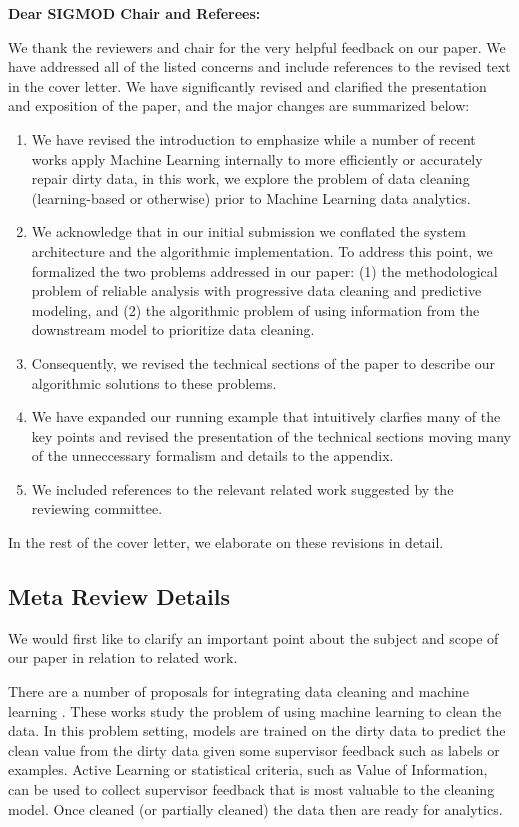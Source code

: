 {\noindent \normalsize \bf Dear SIGMOD Chair and Referees: }

\vspace{.5em}

We thank the reviewers and chair for the very helpful feedback on our paper. We have addressed all of the listed concerns and include references to the revised text in the cover letter. 
We have significantly revised and clarified the presentation and exposition
of the paper, and the major changes are summarized below:
\begin{enumerate}
\item We have revised the introduction to emphasize while a number of recent works apply Machine Learning internally to more efficiently or accurately repair dirty data, in this work, we explore the problem of data cleaning (learning-based or otherwise) prior to Machine Learning data analytics.
\item We acknowledge that in our initial submission we conflated the system architecture and the algorithmic implementation. To address this point, we formalized the two problems addressed in our paper: (1) the methodological problem of reliable analysis with progressive data cleaning and predictive modeling, and (2) the algorithmic problem of using information from the downstream model to prioritize data cleaning. 
\item Consequently, we revised the technical sections of the paper to describe our algorithmic solutions to these problems. 
\item We have expanded our running example that intuitively clarfies many of the key points and revised the presentation of the technical sections moving many of the unneccessary formalism and details to the appendix.
\item We included references to the relevant related work suggested by the reviewing committee.
\end{enumerate}
In the rest of the cover letter, we elaborate on these revisions in detail.

\vspace{0.5em}

\subsection*{Meta Review Details} 

We would first like to clarify an important point about the subject and scope of our paper in relation to related work.

There are a number of proposals for integrating data cleaning and machine learning \cite{gokhale2014corleone, DBLP:journals/pvldb/YakoutENOI11, yakout2013don}.
These works study the problem of using machine learning to clean the data.
In this problem setting, models are trained on the dirty data to predict the clean value from the dirty data given some supervisor feedback such as labels or examples.
Active Learning or statistical criteria, such as Value of Information, can be used to collect supervisor feedback that is most valuable to the cleaning model.
Once cleaned (or partially cleaned) the data then are ready for analytics.


